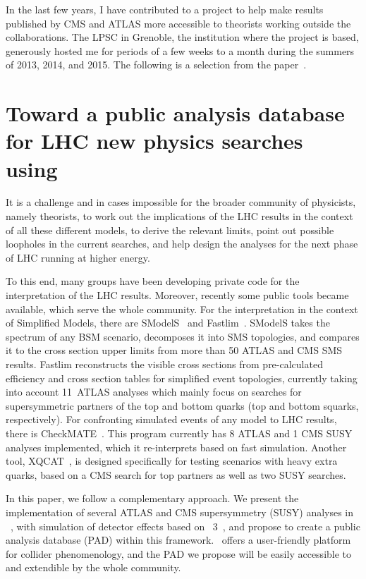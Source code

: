 
In the last few years, I have contributed to a project to help make results published by CMS and ATLAS more accessible to theorists working outside the collaborations. The LPSC in Grenoble, the institution where the project is based, generously hosted me for periods of a few weeks to a month during the summers of 2013, 2014, and 2015. The following is a selection from the paper~\cite{Dumont:2014tja}.


\section{Toward a public analysis database for LHC new physics searches using \ma}
It is a challenge and in cases impossible for the broader community of physicists, namely theorists,
 to work out the implications of the LHC results 
in the context of all these different models, to derive the relevant limits, point out  
possible loopholes in the current searches, and help design the analyses for the 
next phase of LHC running at higher energy.

To this end, many groups have been developing private code for the interpretation of the LHC results. 
Moreover, recently some public tools became available, which serve the whole community. 
For the interpretation in the context of Simplified Models, there are {\sc SModelS}~\cite{Kraml:2014sna} 
and {\sc Fastlim}~\cite{Papucci:2014rja}. 
{\sc SModelS} takes the spectrum of any BSM scenario, decomposes it into SMS topologies, and compares it to the cross section upper limits from more than 50 ATLAS and CMS SMS results. 
{\sc Fastlim} reconstructs the visible cross sections from pre-calculated efficiency and cross section tables for simplified event topologies, currently taking into account 11~ATLAS analyses which mainly focus on searches for supersymmetric partners of the top and bottom quarks (top and bottom squarks, respectively).   
For confronting simulated events of any model to LHC results, there is {\sc CheckMATE}~\cite{Drees:2013wra}. 
This program currently has 8 ATLAS and 1 CMS SUSY analyses implemented, which it re-interprets based on fast simulation. 
Another tool, {\sc XQCAT}~\cite{Barducci:2014gna}, is designed specifically for testing scenarios with 
heavy extra quarks, based on a CMS search for top partners as well as two SUSY searches.
  
In this paper, we follow a complementary approach. We present the implementation  
of several  ATLAS and CMS supersymmetry (SUSY) analyses in \ma~\cite{Conte:2012fm,Conte:2014zja}, 
with simulation of detector effects based on \delphes~3~\cite{deFavereau:2013fsa}, 
and propose to create a public analysis database (PAD) within this framework. 
\ma\ offers a user-friendly platform for collider phenomenology, 
and the PAD we propose will be easily accessible to and extendible by the whole community.

